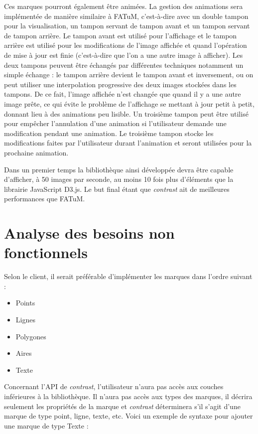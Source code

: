 \documentclass[12pt]{article}
\begin{document}
Ces marques pourront également être animées. La gestion des animations sera implémentée de manière similaire
à FATuM, c'est-à-dire avec un double tampon pour la visualisation, un tampon servant de tampon avant et un tampon servant de tampon arrière. Le tampon avant est utilisé pour l'affichage et le tampon arrière est utilisé pour les modifications de l'image affichée et quand l'opération de mise à jour est finie (c'est-à-dire que l'on a une autre image à afficher). Les deux tampons peuvent être échangés par différentes techniques notamment un simple échange : le tampon arrière devient le tampon avant et inversement, ou on peut utiliser une interpolation progressive des deux images stockées dans les tampons. De ce fait, l'image affichée n'est changée que quand il y a une autre image prête, ce qui évite le problème de l'affichage se mettant à jour petit à petit, donnant lieu à des animations peu lisible. Un troisième tampon peut être utilisé pour empêcher l'annulation d'une animation si l'utilisateur demande une modification pendant une animation. Le troisième tampon stocke les modifications faites par l'utilisateur durant l'animation et seront utilisées pour la prochaine animation.

Dans un premier temps la bibliothèque ainsi développée devra être capable d'afficher,
à 50 images par seconde, au moins 10 fois plus d’éléments que la librairie JavaScript D3.js. 
Le but final étant que \textit{contrast} ait de meilleures performances que FATuM.

\section{Analyse des besoins non fonctionnels}

Selon le client, il serait préférable d'implémenter les marques dans l'ordre suivant :
\begin{itemize}
    \item Points
    \item Lignes
    \item Polygones
    \item Aires
    \item Texte
\end{itemize}

Concernant l'API de \textit{contrast}, l'utilisateur n'aura pas accès aux
couches inférieures à la bibliothèque. Il n'aura pas accès aux types des marques,
il décrira seulement les propriétés de la marque et \textit{contrast} déterminera
s'il s'agit d'une marque de type point, ligne, texte, etc.
Voici un exemple de syntaxe pour ajouter une marque de type Texte :
\end{document}
